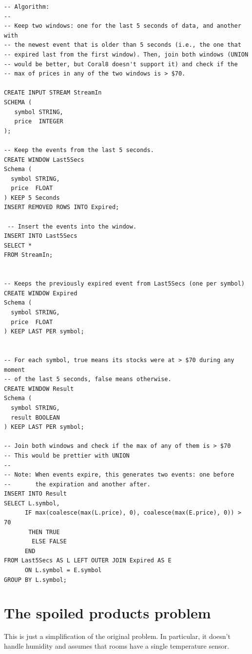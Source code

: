 \documentclass{report}
\begin{document}
\begin{verbatim}
-- Algorithm:
--
-- Keep two windows: one for the last 5 seconds of data, and another with
-- the newest event that is older than 5 seconds (i.e., the one that
-- expired last from the first window). Then, join both windows (UNION
-- would be better, but Coral8 doesn't support it) and check if the
-- max of prices in any of the two windows is > $70.

CREATE INPUT STREAM StreamIn
SCHEMA (
   symbol STRING,
   price  INTEGER
);

-- Keep the events from the last 5 seconds.
CREATE WINDOW Last5Secs
Schema (
  symbol STRING,
  price  FLOAT
) KEEP 5 Seconds
INSERT REMOVED ROWS INTO Expired;

 -- Insert the events into the window.
INSERT INTO Last5Secs
SELECT *
FROM StreamIn;


-- Keeps the previously expired event from Last5Secs (one per symbol)
CREATE WINDOW Expired
Schema (
  symbol STRING,
  price  FLOAT
) KEEP LAST PER symbol;


-- For each symbol, true means its stocks were at > $70 during any moment
-- of the last 5 seconds, false means otherwise.
CREATE WINDOW Result
Schema (
  symbol STRING,
  result BOOLEAN
) KEEP LAST PER symbol;

-- Join both windows and check if the max of any of them is > $70
-- This would be prettier with UNION
--
-- Note: When events expire, this generates two events: one before
--       the expiration and another after.
INSERT INTO Result
SELECT L.symbol,
      IF max(coalesce(max(L.price), 0), coalesce(max(E.price), 0)) > 70
       THEN TRUE
        ELSE FALSE
      END
FROM Last5Secs AS L LEFT OUTER JOIN Expired AS E
      ON L.symbol = E.symbol
GROUP BY L.symbol;
\end{verbatim}

\section{The spoiled products problem}
\label{sec:spoiled-products-solution}

This is just a simplification of the original problem. In particular,
it doesn't handle humidity and assumes that rooms have a single
temperature sensor.
\end{document}
